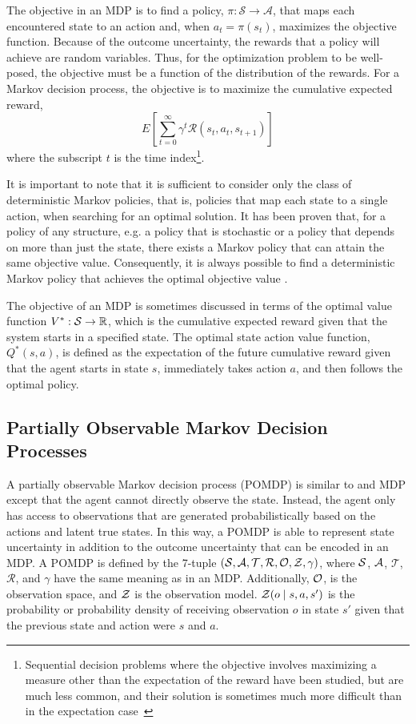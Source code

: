 The objective in an MDP is to find a policy, $\pi: \mathcal{S} \to \mathcal{A}$, that maps each encountered state to an action and, when $a_t = \pi(s_t)$, maximizes the objective function.
Because of the outcome uncertainty, the rewards that a policy will achieve are random variables.
Thus, for the optimization problem to be well-posed, the objective must be a function of the distribution of the rewards.
For a Markov decision process, the objective is to maximize the cumulative expected reward,
\begin{equation} \label{eq:cumulative}
    E\left[\sum_{t=0}^\infty \gamma^t \mathcal{R}(s_t, a_t, s_{t+1}) \right]
\end{equation}
where the subscript $t$ is the time index\footnote{Sequential decision problems where the objective involves maximizing a measure other than the expectation of the reward have been studied, but are much less common, and their solution is sometimes much more difficult than in the expectation case~\cite{chow2015risk}}.

It is important to note that it is sufficient to consider only the class of deterministic Markov policies, that is, policies that map each state to a single action, when searching for an optimal solution.
It has been proven that, for a policy of any structure, e.g. a policy that is stochastic or a policy that depends on more than just the state, there exists a Markov policy that can attain the same objective value.
Consequently, it is always possible to find a deterministic Markov policy that achieves the optimal objective value \cite{EA:99}.

The objective of an MDP is sometimes discussed in terms of the optimal value function $V^*: \mathcal{S} \to \mathbb{R}$, which is the cumulative expected reward given that the system starts in a specified state.
The optimal state action value function, $Q^*(s,a)$, is defined as the expectation of the future cumulative reward given that the agent starts in state $s$, immediately takes action $a$, and then follows the optimal policy.

\subsection{Partially Observable Markov Decision Processes} \label{sec:pomdps}

A partially observable Markov decision process (POMDP) is similar to and MDP except that the agent cannot directly observe the state.
Instead, the agent only has access to observations that are generated probabilistically based on the actions and latent true states.
In this way, a POMDP is able to represent state uncertainty in addition to the outcome uncertainty that can be encoded in an MDP.
A POMDP is defined by the 7-tuple $(\mathcal{S}, \mathcal{A}, \mathcal{T}, \mathcal{R}, \mathcal{O}, \mathcal{Z}, \gamma)$, where $\mathcal{S}$, $\mathcal{A}$, $\mathcal{T}$, $\mathcal{R}$, and $\gamma$ have the same meaning as in an MDP.
Additionally, $\mathcal{O}$, is the observation space, and $\mathcal{Z}$ is the observation model.
$\mathcal{Z}(o \mid s, a, s')$ is the probability or probability density of receiving observation $o$ in state $s'$ given that the previous state and action were $s$ and $a$.

